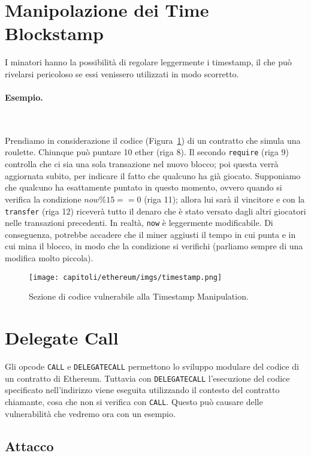 \section{Manipolazione dei Time Blockstamp}

I minatori hanno la possibilità di regolare leggermente i timestamp, il che può rivelarsi pericoloso se essi venissero utilizzati in modo scorretto.

\paragraph{Esempio.}\

Prendiamo in considerazione il codice (Figura~\ref{fig:timestamp}) di un contratto che simula una roulette.
Chiunque può puntare 10 ether (riga 8).
Il secondo \verb|require| (riga 9) controlla che ci sia una sola transazione nel nuovo blocco;
poi questa verrà aggiornata subito, per indicare il fatto che qualcuno ha già giocato.
Supponiamo che qualcuno ha esattamente puntato in questo
momento, ovvero quando si verifica la condizione $now \%15 ==  0$ (riga 11); allora lui sarà il vincitore e con la \verb|transfer| (riga 12) riceverà tutto il denaro che è stato versato dagli altri giocatori nelle
transazioni precedenti.
In realtà, \verb|now| è leggermente modificabile.
Di conseguenza, potrebbe accadere che il miner aggiusti il tempo in cui punta e in cui mina il blocco,
in modo che la condizione si verifichi (parliamo sempre di una modifica molto piccola).

\begin{figure}[H]
	\centering
	\texttt{[image: capitoli/ethereum/imgs/timestamp.png]}
	\caption{Sezione di codice vulnerabile alla Timestamp Manipulation.}
	\label{fig:timestamp}
\end{figure}

\section{Delegate Call}

Gli opcode \verb|CALL| e \verb|DELEGATECALL| permettono lo sviluppo modulare del codice di un contratto di Ethereum.
Tuttavia con \verb|DELEGATECALL| l'esecuzione del codice specificato nell'indirizzo viene eseguita utilizzando il contesto del contratto chiamante,
cosa che non si verifica con \verb|CALL|.
Questo può causare delle vulnerabilità che vedremo ora con un esempio.

\subsection{Attacco}

